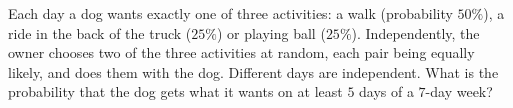 Each day a dog wants exactly one of three activities: a walk (probability $50\%$), a ride in the back of the truck ($25\%$) or playing ball ($25\%$). Independently, the owner chooses two of the three activities at random, each pair being equally likely, and does them with the dog. Different days are independent. What is the probability that the dog gets what it wants on at least $5$ days of a $7$-day week?
